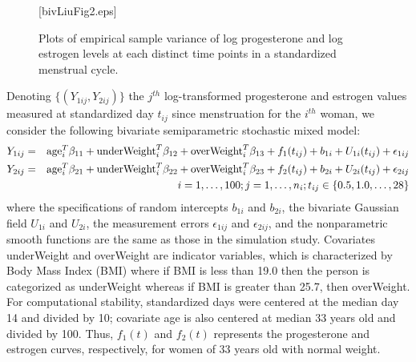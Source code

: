 \documentclass[article,lineno]{biometrika}
\begin{document}
\begin{figure}
\figurebox{20pc}{25pc}{}[bivLiuFig2.eps]
\caption{Plots of empirical sample variance of log progesterone  and log estrogen levels at each distinct time points in a standardized menstrual cycle.}
\label{Liu2}
\end{figure}

Denoting $\{(Y_{1ij}, Y_{2ij})\}$ the $j^{th}$ log-transformed progesterone and estrogen values measured at standardized day $t_{ij}$ since menstruation for the $i^{th}$ woman, we consider the following bivariate semiparametric stochastic mixed model:
\begin{eqnarray*}
Y_{1ij} &=& {\rm age}_i^T  \beta_{11}  + {\rm underWeight}_i^T  \beta_{12}
+ {\rm overWeight}_i^T  \beta_{13}
+ f_1(t_{ij}) + b_{1i} + U_{1i}(t_{ij}) + \epsilon_{1ij} 
 \\
Y_{2ij} &=& {\rm age}_i^T  \beta_{21} +  {\rm underWeight}_i^T  \beta_{22}
+  {\rm overWeight}_i^T  \beta_{23}
+ f_2(t_{ij}) + b_{2i} + U_{2i}(t_{ij}) + \epsilon_{2ij} 
\\
&& i = 1, \dots, 100; j  = 1, \dots, n_i; t_{ij} \in \{0.5, 1.0, \dots, 28\}
\end{eqnarray*}
where the specifications of random intercepts $b_{1i}$ and $b_{2i}$, the bivariate Gaussian field  $U_{1i}$ and $U_{2i}$, the measurement errors $ \epsilon_{1ij} $ and $ \epsilon_{2ij}$, and the nonparametric smooth functions are the same as those in the simulation study. Covariates underWeight and overWeight are indicator variables, which is characterized by Body Mass Index (BMI)  where if BMI is less than 19.0 then the person is categorized as underWeight whereas if BMI is greater than 25.7, then overWeight. 
For computational stability, standardized days were centered at the median day 14 and divided by 10; covariate age is also centered at median 33 years old and divided by 100. Thus, $f_1(t)$ and $f_2(t)$ represents the progesterone and estrogen curves, respectively, for women of 33 years old with normal weight. 
\end{document}
